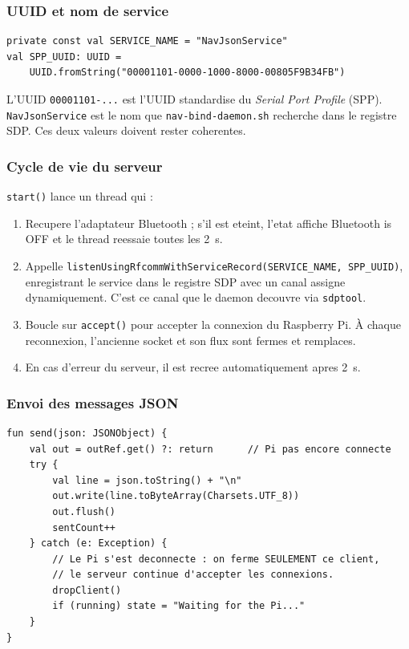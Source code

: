 \documentclass[a4paper,11pt]{article}
\begin{document}
\subsubsection{UUID et nom de service}

\begin{lstlisting}[style=ktcode,caption={NavServer.kt --- constantes}]
private const val SERVICE_NAME = "NavJsonService"
val SPP_UUID: UUID =
    UUID.fromString("00001101-0000-1000-8000-00805F9B34FB")
\end{lstlisting}

L'UUID \texttt{00001101-...} est l'UUID standardise du \emph{Serial Port Profile} (SPP).
\texttt{NavJsonService} est le nom que \texttt{nav-bind-daemon.sh} recherche dans le
registre SDP. Ces deux valeurs doivent rester coherentes.

\subsubsection{Cycle de vie du serveur}

\texttt{start()} lance un thread qui :

\begin{enumerate}
  \item Recupere l'adaptateur Bluetooth ; s'il est eteint, l'etat affiche
    \og Bluetooth is OFF\fg{} et le thread reessaie toutes les 2~s.
  \item Appelle \texttt{listenUsingRfcommWithServiceRecord(SERVICE\_NAME, SPP\_UUID)},
    enregistrant le service dans le registre SDP avec un canal assigne dynamiquement.
    C'est ce canal que le daemon decouvre via \texttt{sdptool}.
  \item Boucle sur \texttt{accept()} pour accepter la connexion du Raspberry Pi.
    À chaque reconnexion, l'ancienne socket et son flux sont fermes et remplaces.
  \item En cas d'erreur du serveur, il est recree automatiquement apres 2~s.
\end{enumerate}

\subsubsection{Envoi des messages JSON}

\begin{lstlisting}[style=ktcode,caption={NavServer.kt --- send()}]
fun send(json: JSONObject) {
    val out = outRef.get() ?: return      // Pi pas encore connecte
    try {
        val line = json.toString() + "\n"
        out.write(line.toByteArray(Charsets.UTF_8))
        out.flush()
        sentCount++
    } catch (e: Exception) {
        // Le Pi s'est deconnecte : on ferme SEULEMENT ce client,
        // le serveur continue d'accepter les connexions.
        dropClient()
        if (running) state = "Waiting for the Pi..."
    }
}
\end{lstlisting}
\end{document}
